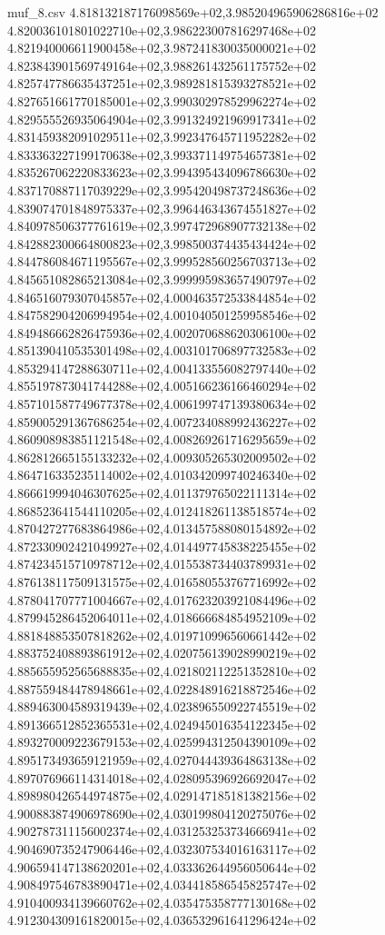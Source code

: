 \begin{filecontents*}{muf_8.csv}
4.818132187176098569e+02,3.985204965906286816e+02
4.820036101801022710e+02,3.986223007816297468e+02
4.821940006611900458e+02,3.987241830035000021e+02
4.823843901569749164e+02,3.988261432561175752e+02
4.825747786635437251e+02,3.989281815393278521e+02
4.827651661770185001e+02,3.990302978529962274e+02
4.829555526935064904e+02,3.991324921969917341e+02
4.831459382091029511e+02,3.992347645711952282e+02
4.833363227199170638e+02,3.993371149754657381e+02
4.835267062220833623e+02,3.994395434096786630e+02
4.837170887117039229e+02,3.995420498737248636e+02
4.839074701848975337e+02,3.996446343674551827e+02
4.840978506377761619e+02,3.997472968907732138e+02
4.842882300664800823e+02,3.998500374435434424e+02
4.844786084671195567e+02,3.999528560256703713e+02
4.845651082865213084e+02,3.999995983657490797e+02
4.846516079307045857e+02,4.000463572533844854e+02
4.847582904206994954e+02,4.001040501259958546e+02
4.849486662826475936e+02,4.002070688620306100e+02
4.851390410535301498e+02,4.003101706897732583e+02
4.853294147288630711e+02,4.004133556082797440e+02
4.855197873041744288e+02,4.005166236166460294e+02
4.857101587749677378e+02,4.006199747139380634e+02
4.859005291367686254e+02,4.007234088992436227e+02
4.860908983851121548e+02,4.008269261716295659e+02
4.862812665155133232e+02,4.009305265302009502e+02
4.864716335235114002e+02,4.010342099740246340e+02
4.866619994046307625e+02,4.011379765022111314e+02
4.868523641544110205e+02,4.012418261138518574e+02
4.870427277683864986e+02,4.013457588080154892e+02
4.872330902421049927e+02,4.014497745838225455e+02
4.874234515710978712e+02,4.015538734403789931e+02
4.876138117509131575e+02,4.016580553767716992e+02
4.878041707771004667e+02,4.017623203921084496e+02
4.879945286452064011e+02,4.018666684854952109e+02
4.881848853507818262e+02,4.019710996560661442e+02
4.883752408893861912e+02,4.020756139028990219e+02
4.885655952565688835e+02,4.021802112251352810e+02
4.887559484478948661e+02,4.022848916218872546e+02
4.889463004589319439e+02,4.023896550922745519e+02
4.891366512852365531e+02,4.024945016354122345e+02
4.893270009223679153e+02,4.025994312504390109e+02
4.895173493659121959e+02,4.027044439364863138e+02
4.897076966114314018e+02,4.028095396926692047e+02
4.898980426544974875e+02,4.029147185181382156e+02
4.900883874906978690e+02,4.030199804120275076e+02
4.902787311156002374e+02,4.031253253734666941e+02
4.904690735247906446e+02,4.032307534016163117e+02
4.906594147138620201e+02,4.033362644956050644e+02
4.908497546783890471e+02,4.034418586545825747e+02
4.910400934139660762e+02,4.035475358777130168e+02
4.912304309161820015e+02,4.036532961641296424e+02

\end{filecontents*}

